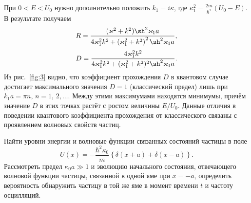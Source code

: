 \documentclass[a4paper]{article}
\begin{document}
\begin{sol}
При $0<E<U_0$ нужно дополнительно положить $k_1=i\kappa$, где
$
	\kappa_1^2= \frac{2m}{\hbar^2}(U_0-E)
.$ В результате получаем
\[
	R=\frac{(\kappa^2+k^2) \sh^2 \kappa_1 a}{4 \kappa_1^2 k^2
	+\left( \kappa_1^2 +k^2 \right) ^2 \sh^2 \kappa_1 a}
 ,\]
\[
	D= \frac{4\kappa_1^2 k^2}{4\kappa_1^2 k^2 + (\kappa_1^2+
	k^2)^2 \sh^2 \kappa_1 a}
.\] 
Из рис.~\ref{fig:3} видно, что коэффициент прохождения $D$ в квантовом
случае достигает максимального значения $D=1$ (классический предел)
лишь при $k_1 a=\pi n$, $n=1,\,2,\ldots$. Между этими максимумами
находятся минимумы, причём значение $D$ в этих точках растёт с
ростом величины $E /U_0$. Данные отличия в поведении квантового
коэффициента прохождения от классического связаны с проявлением
волновых свойств частиц.
\end{sol}
\begin{problem}
	Найти уровни энергии и волновые функции связанных состояний частицы в поле
\[
	U(x)= - \frac{\hbar^2 \kappa_0}{m}\left\{ 
	\delta(x+a)+\delta(x-a)\right\} 
.\] 
Рассмотреть предел $\kappa_0 a \gg 1$ и эволюцию начального состояния, отвечающего волновой функции частицы, связанной в одной
яме при $x=-a$, определить вероятность обнаружить частицу в той
же яме в момент времени $t$ и частоту осцилляций.
\end{problem}
\end{document}

